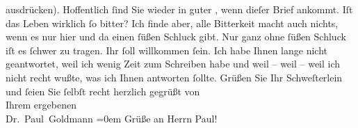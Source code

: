 \begin{ledgroupsized}[t]{13cm}
               ausdrücken).\pend
           \pstart
           {\pb}Hoffentlich ſind Sie wieder in guter \label{K_L03526-7v}\label{K_L03526-7h}, wenn dieſer Brief ankommt. Iſt das
               Leben wirklich ſo bitter? Ich finde aber, alle Bitterkeit macht auch nichts, wenn es
                  \strikeout{\textcolor{gray}{×}\-\textcolor{gray}{×}\-\textcolor{gray}{×}\-\textcolor{gray}{×}\-\textcolor{gray}{×}\-\textcolor{gray}{×}}{ }\introOben{}nur\introOben{} hier und da einen ſüßen Schluck gibt. Nur ganz ohne \strikeout{\textcolor{gray}{feſ}\textcolor{gray}{×}\-\textcolor{gray}{×}\-\textcolor{gray}{×}\-\textcolor{gray}{×}\-\textcolor{gray}{×}\textcolor{gray}{k}} ſüßen Schluck iſt es ſchwer zu tragen.\pend
           \pstart
           Ihr \label{K_L03526-17v}\label{K_L03526-17h} ſoll
               willkommen ſein.\pend
           \pstart
           Ich habe Ihnen lange nicht geantwortet, weil ich wenig Zeit zum Schreiben habe und
               weil – weil – weil ich nicht recht wußte, {\pb}was ich
               Ihnen antworten ſollte.\pend
           \pstart
           Grüßen Sie Ihr Schweſterlein und ſeien Sie ſelbſt recht herzlich gegrüßt von {\\[\baselineskip]}Ihrem
               ergebenen {\\[\baselineskip]}\spacefill\mbox{Dr. Paul Goldmann}\pend
           \leftskip=0em{}\pstart
           \noindent{}Grüße an Herrn Paul!\pend
           
         
         \endnumbering{}\end{ledgroupsized}\begin{anhang}\end{anhang}\newcommand{\dateiname}{L03526}\newcommand{\titel}{Paul Goldmann an Olga Gussmann, 9. 3. [1901]}\newcommand{\editorInnen}{Martin Anton Müller und Laura Untner}
      